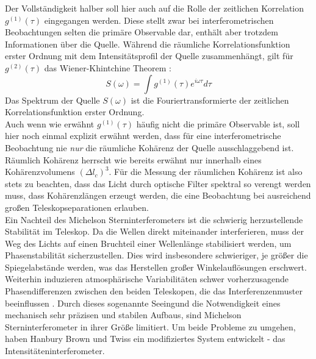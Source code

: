 Der Vollständigkeit halber soll hier auch auf die Rolle der zeitlichen Korrelation $g^{(1)}(\tau)$ eingegangen werden. 
Diese stellt zwar bei interferometrischen Beobachtungen selten die primäre Observable dar, enthält aber trotzdem Informationen über die Quelle. 
Während die räumliche Korrelationsfunktion erster Ordnung mit dem Intensitätsprofil der Quelle zusammenhängt, gilt für $g^{(2)}(\tau)$ das Wiener-Khintchine Theorem \cite{lasseguesFieldIntensityCorrelations2022}:
\begin{equation}
    S(\omega) =  \int g^{(1)}(\tau) e^{i\omega\tau} d\tau
\end{equation}
Das Spektrum der Quelle $S(\omega)$ ist die Fouriertransformierte der zeitlichen Korrelationsfunktion erster Ordnung. \\
Auch wenn wie erwähnt $g^{(1)}(\tau)$ häufig nicht die primäre Observable ist, soll hier noch einmal explizit erwähnt werden, dass für eine interferometrische Beobachtung nie \emph{nur} die räumliche Kohärenz der Quelle ausschlaggebend ist. 
Räumlich Kohärenz herrscht wie bereits erwähnt nur innerhalb eines Kohärenzvolumens $(\Delta l_c) ^3$. 
Für die Messung der räumlichen Kohärenz ist also stets zu beachten, dass das Licht durch optische Filter spektral so verengt werden muss, dass Kohärenzlängen erzeugt werden, die eine Beobachtung bei ausreichend großen Teleskopseparationen erlauben. \\

Ein Nachteil des Michelson Sterninterferometers ist die schwierig herzustellende Stabilität im Teleskop. 
Da die Wellen direkt miteinander interferieren, muss der Weg des Lichts auf einen Bruchteil einer Wellenlänge stabilisiert werden, um Phasenstabilität sicherzustellen. 
Dies wird insbesondere schwieriger, je größer die Spiegelabstände werden, was das Herstellen großer Winkelauflösungen erschwert. 
Weiterhin induzieren atmosphärische Variabilitäten schwer vorherzusagende Phasendifferenzen zwischen den beiden Teleskopen, die das Interferenzenmuster beeinflussen \cite[Kap. 2]{brownIntensityInterferometerIts1974}. 
Durch dieses sogenannte \glqq Seeing\grqq\;und die Notwendigkeit eines mechanisch sehr präzisen und stabilen Aufbaus, sind Michelson Sterninterferometer in ihrer Größe limitiert. 
Um beide Probleme zu umgehen, haben Hanbury Brown und Twiss ein modifiziertes System entwickelt - das Intensitäteninterferometer.

